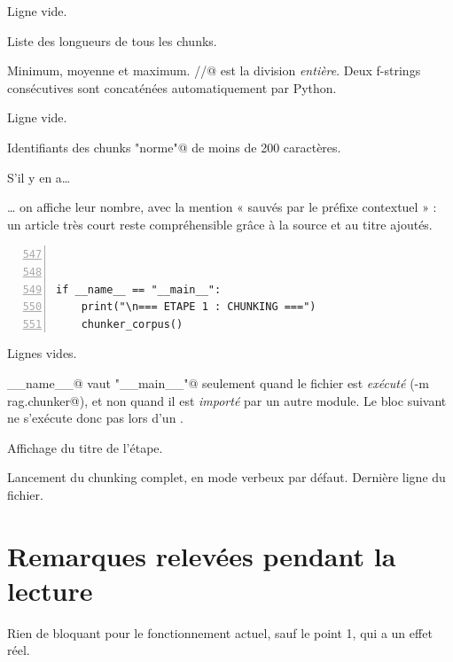 \documentclass[11pt,a4paper]{article}
\newcommand{\ligne}[1]{\item[\textcolor{num}{L.\,#1}]}
\newenvironment{explication}
  {\begin{description}\setlength{\itemsep}{3pt}\setlength{\parskip}{2pt}}
  {\end{description}}
\begin{document}
\begin{explication}
\ligne{536} Ligne vide.
\ligne{537} Liste des longueurs de tous les chunks.
\ligne{538--539} Minimum, moyenne et maximum. \Verb@//@ est la division \emph{entière}.
Deux f-strings consécutives sont concaténées automatiquement par Python.
\ligne{540} Ligne vide.
\ligne{541--543} Identifiants des chunks \Verb@"norme"@ de moins de 200 caractères.
\ligne{544} S'il y en a…
\ligne{545--546} … on affiche leur nombre, avec la mention « sauvés par le préfixe contextuel » :
un article très court reste compréhensible grâce à la source et au titre ajoutés.
\end{explication}

\begin{shaded}
\begin{Verbatim}[numbers=left,firstnumber=547,numbersep=6pt,fontsize=\footnotesize,xleftmargin=1.2em]


if __name__ == "__main__":
    print("\n=== ETAPE 1 : CHUNKING ===")
    chunker_corpus()
\end{Verbatim}
\end{shaded}

\begin{explication}
\ligne{547--548} Lignes vides.
\ligne{549} \Verb@__name__@ vaut \Verb@"__main__"@ seulement quand le fichier est
\emph{exécuté} (\Verb@python -m rag.chunker@), et non quand il est \emph{importé} par un autre
module. Le bloc suivant ne s'exécute donc pas lors d'un \Verb@import@.
\ligne{550} Affichage du titre de l'étape.
\ligne{551} Lancement du chunking complet, en mode verbeux par défaut. Dernière ligne du fichier.
\end{explication}


\newpage
\section{Remarques relevées pendant la lecture}

Rien de bloquant pour le fonctionnement actuel, sauf le point 1, qui a un effet réel.
\end{document}
